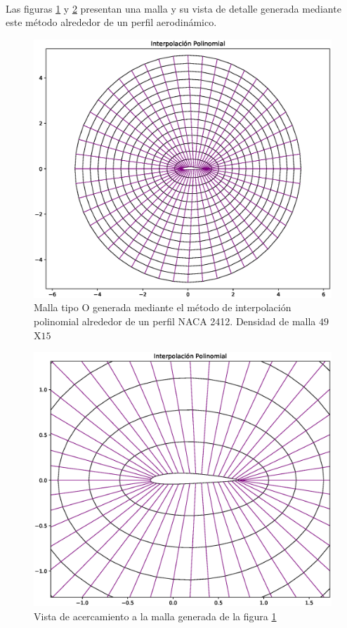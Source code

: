 \documentclass[letterpaper, openright, 12pt]{book}
\begin{document}
			\paragraph*{}
				Las figuras \ref{fig:malla-inter} y \ref{fig:malla-inter-cerca} presentan una malla y su vista de detalle generada mediante este método alrededor de un perfil aerodinámico.				
				\begin{figure}[htbp!]
					\centering
					\includegraphics[width=120mm]{./Imagenes/M-inter_pol}
					\captionsetup{justification=centering, margin=2cm}
					\caption[Malla Interpolación Polinomial]{Malla tipo O generada mediante el método de interpolación polinomial alrededor de un perfil NACA 2412. Densidad de malla $49$X$15$}
					\label{fig:malla-inter}
				\end{figure}
				\begin{figure}[htbp!]
					\centering
					\includegraphics[width=120mm]{./Imagenes/M-inter_pol_cerca}
					\captionsetup{justification=centering, margin=2cm}
					\caption[Malla Interpolación Polinomial Acercamiento]{Vista de acercamiento a la malla generada de la figura \ref{fig:malla-inter} }
					\label{fig:malla-inter-cerca}
				\end{figure}
		
\end{document}
